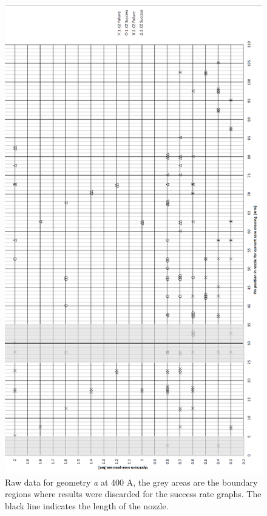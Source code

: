\documentclass[10pt,a4paper,twoside]{article}
\begin{document}
\begin{figure}[H]
\centering
\includegraphics[scale=0.55]{Bilder/Results/rawData400AgeoA.png}
\caption{Raw data for geometry \textit{a} at 400 A, the grey areas are the boundary regions where results were discarded for the success rate graphs. The black line indicates the length of the nozzle.} \label{fig:rawData400AgeoA}
\end{figure}
\newpage
\end{document}
